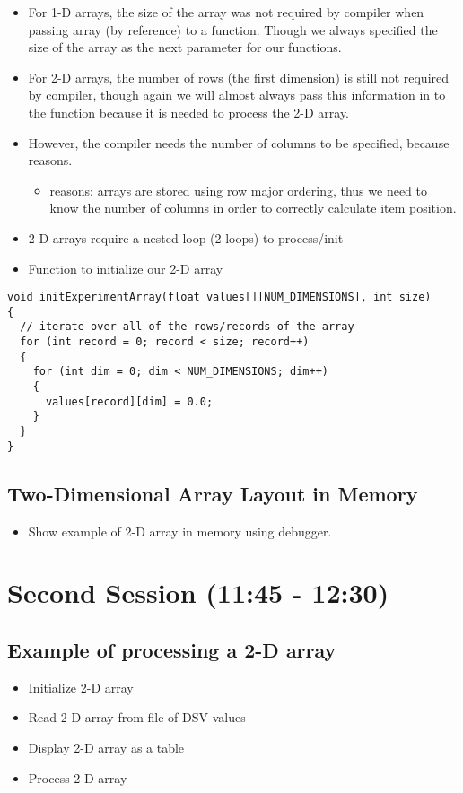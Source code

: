 \documentclass[11pt]{article}
\begin{document}
\begin{itemize}
\item For 1-D arrays, the size of the array was not required by compiler
when passing array (by reference) to a function.  Though we always
specified the size of the array as the next parameter for our functions.

\item For 2-D arrays, the number of rows (the first dimension) is still not
required by compiler, though again we will almost always pass this
information in to the function because it is needed to process the
2-D array.
\item However, the compiler needs the number of columns to be specified, 
because reasons.
\begin{itemize}
\item reasons: arrays are stored using row major ordering, thus we need to
know the number of columns in order to correctly calculate item
position.
\end{itemize}
\item 2-D arrays require a nested loop (2 loops) to process/init
\item Function to initialize our 2-D array
\end{itemize}

\begin{verbatim}
void initExperimentArray(float values[][NUM_DIMENSIONS], int size)
{
  // iterate over all of the rows/records of the array
  for (int record = 0; record < size; record++)
  {
    for (int dim = 0; dim < NUM_DIMENSIONS; dim++)
    {
      values[record][dim] = 0.0;
    }
  }
}
\end{verbatim}
\subsection{Two-Dimensional Array Layout in Memory}
\label{sec-1-2}
\begin{itemize}
\item Show example of 2-D array in memory using debugger.
\end{itemize}
\section{Second Session (11:45 - 12:30)}
\label{sec-2}
\subsection{Example of processing a 2-D array}
\label{sec-2-1}
\begin{itemize}
\item Initialize 2-D array
\item Read 2-D array from file of DSV values
\item Display 2-D array as a table
\item Process 2-D array
\end{itemize}
\end{document}

